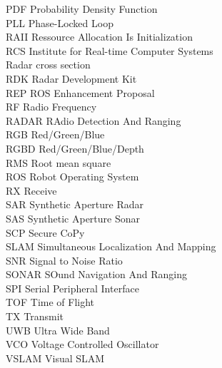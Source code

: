 \begin{listofabbrevs}
\begin{tabbing}
PDF \> Probability Density Function \\
PLL \> Phase-Locked Loop \\
RAII \> Ressource Allocation Is Initialization \\
RCS \> Institute for Real-time Computer Systems \\
   	\> Radar cross section \\
RDK \> Radar Development Kit \\
REP \> ROS Enhancement Proposal \\
RF \> Radio Frequency \\
RADAR \> RAdio Detection And Ranging \\
RGB \> Red/Green/Blue \\
RGBD \> Red/Green/Blue/Depth \\
RMS \> Root mean square \\
ROS \> Robot Operating System \\
RX \> Receive \\
SAR \> Synthetic Aperture Radar \\
SAS \> Synthetic Aperture Sonar \\
SCP \> Secure CoPy \\
SLAM \> Simultaneous Localization And Mapping \\
SNR \> Signal to Noise Ratio \\
SONAR \> SOund Navigation And Ranging \\
SPI \> Serial Peripheral Interface \\
TOF \> Time of Flight \\
TX \> Transmit \\
UWB \> Ultra Wide Band \\
VCO \> Voltage Controlled Oscillator \\
VSLAM \> Visual SLAM \\

\end{tabbing}
\end{listofabbrevs}
